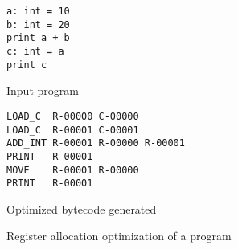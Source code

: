 \begin{slide}
    \begin{figure}[H]
        \centering
        \begin{subtable}{0.3\textwidth}
            \begin{verbatim}
a: int = 10
b: int = 20
print a + b
c: int = a
print c
            \end{verbatim}
        \caption{Input program}
        \end{subtable}
        \begin{subtable}{0.6\textwidth}
            \begin{verbatim}
LOAD_C  R-00000 C-00000
LOAD_C  R-00001 C-00001
ADD_INT R-00001 R-00000 R-00001
PRINT   R-00001
MOVE    R-00001 R-00000
PRINT   R-00001
            \end{verbatim}
        \caption{Optimized bytecode generated}
        \end{subtable}
    \caption{Register allocation optimization of a program}
    \end{figure}
\end{slide}
